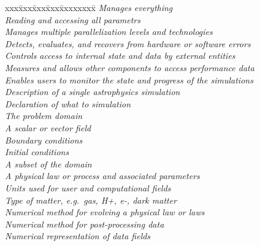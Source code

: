 \documentclass{article}
\begin{document}
\begin{tabbing}
xxx\=xxx\=xxx\=xxx\=xxxxxxxx\= \kill
 \>           \>\>\>\> \textit{Manages everything}  \\
 \>\>        \>\>\> \textit{Reading and accessing all parametrs} \\
 \>\>          \>\>\> \textit{Manages multiple parallelization levels and technologies} \\
 \>\>          \>\>\> \textit{Detects, evaluates, and recovers from hardware or software errors} \\
 \>\>            \>\>\> \textit{Controls access to internal state and data by external entities} \\
 \>\>       \>\>\> \textit{Measures and allows other components to access performance data} \\
 \>\>           \>\>\> \textit{Enables users to monitor the state and progress of the simulations} \\
 \>        \>\>\>\> \textit{Description of a single astrophysics simulation} \\
 \>\>           \>\>\> \textit{Declaration of what to simulation} \\
 \>\>\>            \>\> \textit{The problem domain} \\
 \>\>\>             \>\> \textit{A scalar or vector field} \\
 \>\>\>          \>\> \textit{Boundary conditions} \\
 \>\>\>           \>\> \textit{Initial conditions} \\
 \>\>\>\>            \> \textit{A subset of the domain} \\
 \>\>           \>\>\> \textit{A physical law or process and associated parameters} \\
 \>\>\>             \>\> \textit{Units used for user and computational fields} \\
 \>\>\>          \>\> \textit{Type of matter, e.g.~gas, H+, e-, dark matter} \\
 \>\>            \>\>\> \textit{Numerical method for evolving a physical law or laws} \\
 \>\>          \>\>\> \textit{Numerical method for post-processing data} \\
 \>\>              \>\>\> \textit{Numerical representation of data fields} \\

\end{tabbing}
\end{document}
